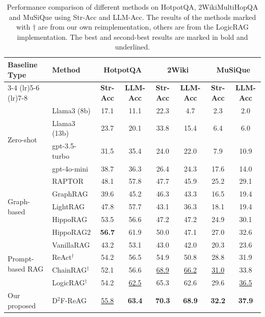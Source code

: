 \documentclass[11pt]{article}
\begin{document}
\begin{table}
  \centering
  \renewcommand{\arraystretch}{0.85}
  \setlength{\tabcolsep}{3.5pt}
  \begin{tabular}{l l c c c c c c}
    \toprule
    \multirow{2}{*}{\textbf{Baseline Type}} & \multirow{2}{*}{\textbf{Method}} &
    \multicolumn{2}{c}{\textbf{HotpotQA}} &
    \multicolumn{2}{c}{\textbf{2Wiki}} &
    \multicolumn{2}{c}{\textbf{MuSiQue}} \\
    \cmidrule(lr){3-4} \cmidrule(lr){5-6} \cmidrule(lr){7-8}
    & & \textbf{Str-Acc} & \textbf{LLM-Acc} & \textbf{Str-Acc} & \textbf{LLM-Acc} & \textbf{Str-Acc} & \textbf{LLM-Acc} \\
    \midrule

    \multirow{4}{*}{Zero-shot} & Llama3 (8b) & 17.1 & 11.1 & 22.3 & 4.7 & 2.3 & 2.0 \\
    & Llama3 (13b) & 23.7 & 20.1 & 33.8 & 15.4 & 6.4 & 6.0 \\
    & gpt-3.5-turbo & 31.5 & 35.4 & 24.0 & 22.0 & 7.9 & 10.9 \\
    & gpt-4o-mini & 38.7 & 36.3 & 26.4 & 24.3 & 17.6 & 14.0 \\

    \midrule
    \multirow{5}{*}{Graph-based} & RAPTOR & 48.1 & 57.8 & 47.7 & 45.9 & 25.2 & 29.1 \\
    & GraphRAG & 39.6 & 45.2 & 46.3 & 43.3 & 16.5 & 19.4 \\
    & LightRAG & 47.8 & 57.7 & 43.1 & 36.3 & 18.1 & 19.4 \\
    & HippoRAG & 53.5 & 56.6 & 47.2 & 47.2 & 24.9 & 30.1 \\
    & HippoRAG2 & \textbf{56.7} & 61.9 & 50.0 & 47.1 & 27.0 & 32.6 \\

    \midrule
    \multirow{4}{*}{Prompt-based RAG} & VanillaRAG & 43.2 & 53.1 & 43.0 & 42.0 & 20.3 & 23.6 \\
    & ReAct$^\dagger$ & 54.2 & 56.5 & 54.9 & 50.8 & 28.8 & 31.9 \\
    & ChainRAG$^\dagger$ & 52.1 & 56.6 & \underline{68.9} & \underline{66.2} & \underline{31.0} & 33.8 \\
    & LogicRAG$^\dagger$ & 54.2 & \underline{62.5} & 65.3 & 62.6 & 29.6 & \underline{36.5} \\

    \midrule
    Our proposed & D$^2$F-ReAG & \underline{55.8} & \textbf{63.4} & \textbf{70.3} & \textbf{68.9} & \textbf{32.2} & \textbf{37.9} \\
    \bottomrule
  \end{tabular}
  \caption{Performance comparison of different methods on HotpotQA, 2WikiMultiHopQA and MuSiQue using Str-Acc and LLM-Acc. The results of the methods marked with † are from our own reimplementation, others are from the LogicRAG implementation. The best and second-best results are marked in bold and underlined.}
  \label{tab:accents}
\end{table}
\end{document}
